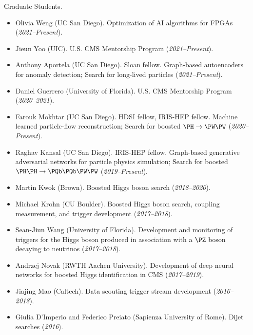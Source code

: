 \documentclass{res}
\begin{document}
\begin{resume}
  Graduate Students.
  \begin{itemize}
    \itemsep-0.3em
    \item Olivia Weng (UC San Diego). Optimization of AI algorithms for FPGAs (\textit{2021--Present}).
    \item Jieun Yoo (UIC). U.S. CMS Mentorship Program (\textit{2021--Present}).
    \item Anthony Aportela (UC San Diego). Sloan fellow. Graph-based autoencoders for anomaly detection; Search for long-lived particles (\textit{2021--Present}).
    \item Daniel Guerrero (University of Florida). U.S. CMS Mentorship Program (\textit{2020--2021}).
    \item Farouk Mokhtar (UC San Diego). HDSI fellow, IRIS-HEP fellow. Machine learned particle-flow reconstruction; Search for boosted $\PH\to\PW\PW$ (\textit{2020--Present}).
    \item Raghav Kansal (UC San Diego). IRIS-HEP fellow. Graph-based generative adversarial networks for particle physics simulation; Search for boosted $\PH\PH\to\PQb\PQb\PW\PW$ (\textit{2019--Present}).
    \item Martin Kwok (Brown). Boosted Higgs boson search (\textit{2018--2020}).
    \item Michael Krohn (CU Boulder). Boosted Higgs boson search, coupling measurement, and trigger development (\textit{2017--2018}).
    \item Sean-Jiun Wang (University of Florida). Development and monitoring of triggers for the Higgs boson produced in association with a $\PZ$ boson decaying to neutrinos (\textit{2017--2018}).
    \item Andrzej Novak (RWTH Aachen University). Development of deep neural networks for boosted Higgs identification in CMS (\textit{2017--2019}).
    \item Jiajing Mao (Caltech). Data scouting trigger stream development (\textit{2016--2018}).
    \item Giulia D'Imperio and Federico Preiato (Sapienza University of Rome). Dijet searches (\textit{2016}).
  \end{itemize}


\end{resume}
\end{document}
